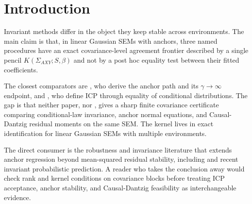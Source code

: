 \documentclass[11pt]{article}
\theoremstyle{definition}
\theoremstyle{plain}
\theoremstyle{remark}
\begin{document}
\section{Introduction}
Invariant methods differ in the object they keep stable across environments. The main claim is that, in linear Gaussian SEMs with anchors, three named procedures have an exact covariance-level agreement frontier described by a single pencil $K(\Sigma_{AXY};S,\beta)$ and not by a post hoc equality test between their fitted coefficients.

The closest comparators are \citet[Section~2, equations (2.3)--(2.6)]{RothenhauslerMeinshausenBuhlmannPeters2021Anchor}, who derive the anchor path and its $\gamma\to\infty$ endpoint, and \citet[Section~2.1, equations (1)--(2)]{PetersBuhlmannMeinshausen2016ICP}, who define ICP through equality of conditional distributions. The gap is that neither paper, nor \citet[Sections~1--2]{RothenhauslerBuhlmannMeinshausen2019CausalDantzig}, gives a sharp finite covariance certificate comparing conditional-law invariance, anchor normal equations, and Causal-Dantzig residual moments on the same SEM. The kernel lives in exact identification for linear Gaussian SEMs with multiple environments.

The direct consumer is the robustness and invariance literature that extends anchor regression beyond mean-squared residual stability, including \citet{KookSickBuhlmann2022DistributionalAnchor} and recent invariant probabilistic prediction. A reader who takes the conclusion away would check rank and kernel conditions on covariance blocks before treating ICP acceptance, anchor stability, and Causal-Dantzig feasibility as interchangeable evidence.
\end{document}
